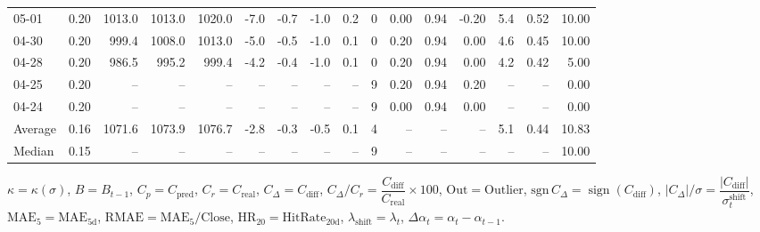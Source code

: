 \begin{threeparttable}
{\begin{tabular}{lrrrrrrrrrrrrrrr}
  05-01 &     0.20 & 1013.0 & 1013.0 & 1020.0 &       -7.0 &           -0.7 &                     -1.0 &                 0.2 &              0 &       0.00 &      0.94 &          -0.20 &              5.4 &            0.52 &                  10.00 \\
  04-30 &     0.20 &  999.4 & 1008.0 & 1013.0 &       -5.0 &           -0.5 &                     -1.0 &                 0.1 &              0 &       0.20 &      0.94 &           0.00 &              4.6 &            0.45 &                  10.00 \\
  04-28 &     0.20 &  986.5 &  995.2 &  999.4 &       -4.2 &           -0.4 &                     -1.0 &                 0.1 &              0 &       0.20 &      0.94 &           0.00 &              4.2 &            0.42 &                   5.00 \\
  04-25 &     0.20 &     -- &     -- &     -- &         -- &             -- &                       -- &                  -- &              9 &       0.20 &      0.94 &           0.20 &               -- &              -- &                   0.00 \\
  04-24 &     0.20 &     -- &     -- &     -- &         -- &             -- &                       -- &                  -- &              9 &       0.00 &      0.94 &           0.00 &               -- &              -- &                   0.00 \\
Average &     0.16 & 1071.6 & 1073.9 & 1076.7 &       -2.8 &           -0.3 &                     -0.5 &                 0.1 &              4 &         -- &        -- &             -- &              5.1 &            0.44 &                  10.83 \\
 Median &     0.15 &     -- &     -- &     -- &         -- &             -- &                       -- &                  -- &              9 &         -- &        -- &             -- &               -- &              -- &                  10.00 \\
\bottomrule
\end{tabular}
}
\begin{tablenotes}\footnotesize
\item $\kappa=\kappa(\sigma)$, $B=B_{t-1}$, $C_p=C_{\text{pred}}$, $C_r=C_{\text{real}}$, $C_\Delta=C_{\text{diff}}$, $C_\Delta/C_r=\dfrac{C_{\text{diff}}}{C_{\text{real}}}\times100$, $\mathrm{Out}=\text{Outlier}$, $\mathrm{sgn}\,C_\Delta=\operatorname{sign}(C_{\text{diff}})$, $|C_\Delta|/\sigma=\dfrac{|C_{\text{diff}}|}{\sigma_t^{\text{shift}}}$, $\mathrm{MAE}_5=\mathrm{MAE}_{5\text{d}}$, $\mathrm{RMAE}= \mathrm{MAE}_5 / \text{Close}$, $\mathrm{HR}_{20}=\mathrm{HitRate}_{20\text{d}}$, 
$\lambda_{\text{shift}}=\lambda_t$, 
$\Delta\alpha_t=\alpha_t-\alpha_{t-1}$.
\end{tablenotes}
\end{threeparttable}
\endgroup

